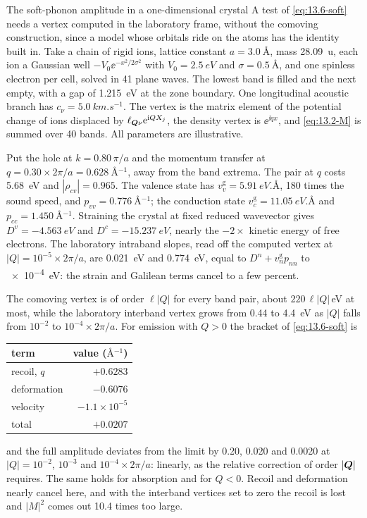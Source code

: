 \begin{workedexample}{The soft-phonon amplitude in a one-dimensional crystal}\label{we:13-soft}
A test of \cref{eq:13.6-soft} needs a vertex computed in the laboratory frame, without the comoving construction, since a model whose orbitals ride on the atoms has the identity built in. Take a chain of rigid ions, lattice constant $a = \SI{3.0}{\angstrom}$, mass \SI{28.09}{\atomicmassunit}, each ion a Gaussian well $-V_0\ee^{-x^2/2\sigma^2}$ with $V_0 = \SI{2.5}{eV}$ and $\sigma = \SI{0.5}{\angstrom}$, and one spinless electron per cell, solved in 41 plane waves. The lowest band is filled and the next empty, with a gap of \SI{1.215}{eV} at the zone boundary. One longitudinal acoustic branch has $c_\nu = \SI{5.0}{km.s^{-1}}$. The vertex is the matrix element of the potential change of ions displaced by $\ell_{\bm{Q}\nu}\mathrm{e}^{\mathrm{i} QX_j}$, the density vertex is $\ee^{\ii qx}$, and \cref{eq:13.2-M} is summed over 40 bands. All parameters are illustrative.

Put the hole at $k = 0.80\,\pi/a$ and the momentum transfer at $q = 0.30\times2\pi/a = \SI{0.628}{\angstrom^{-1}}$, away from the band extrema. The pair at $q$ costs \SI{5.68}{eV} and $|\rho_{cv}| = 0.965$. The valence state has $v^{\mathrm{g}}_v = \SI{5.91}{eV.\angstrom}$, 180 times the sound speed, and $p_{vv} = \SI{0.776}{\angstrom^{-1}}$; the conduction state $v^{\mathrm{g}}_c = \SI{11.05}{eV.\angstrom}$ and $p_{cc} = \SI{1.450}{\angstrom^{-1}}$. Straining the crystal at fixed reduced wavevector gives $D^v = \SI{-4.563}{eV}$ and $D^c = \SI{-15.237}{eV}$, nearly the $-2\times$ kinetic energy of free electrons. The laboratory intraband slopes, read off the computed vertex at $|Q| = 10^{-5}\times2\pi/a$, are \SI{0.021}{eV} and \SI{0.774}{eV}, equal to $D^n + v^{\mathrm{g}}_np_{nn}$ to \SI{e-4}{eV}: the strain and Galilean terms cancel to a few percent.

The comoving vertex is of order $\ell|Q|$ for every band pair, about $220\,\ell|Q|$\,eV at most, while the laboratory interband vertex grows from 0.44 to \SI{4.4}{eV} as $|Q|$ falls from $10^{-2}$ to $10^{-4}\times2\pi/a$. For emission with $Q > 0$ the bracket of \cref{eq:13.6-soft} is
\begin{center}
\small
\begin{tabular}{lr}
  \toprule
  term & value ($\si{\angstrom^{-1}}$) \\
  \midrule
  recoil, $q$ & $+0.6283$ \\
  deformation & $-0.6076$ \\
  velocity & $-1.1\times10^{-5}$ \\
  total & $+0.0207$ \\
  \bottomrule
\end{tabular}
\end{center}
and the full amplitude deviates from the limit by 0.20, 0.020 and 0.0020 at $|Q| = 10^{-2}$, $10^{-3}$ and $10^{-4}\times2\pi/a$: linearly, as the relative correction of order $|\bm{Q}|$ requires. The same holds for absorption and for $Q < 0$. Recoil and deformation nearly cancel here, and with the interband vertices set to zero the recoil is lost and $|M|^2$ comes out 10.4 times too large.


\end{workedexample}
